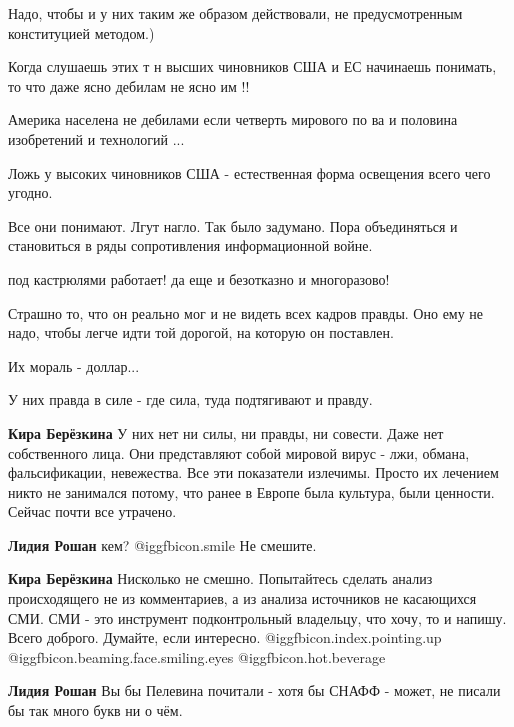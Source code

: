 \begin{itemize}
Надо, чтобы и у них таким же образом действовали, не предусмотренным конституцией методом.)

Когда слушаешь этих т н высших чиновников США и ЕС начинаешь понимать, то что
даже ясно дебилам не ясно им !!

\begin{itemize} %
Америка населена не дебилами если четверть мирового по ва и половина изобретений и технологий ...
\end{itemize} %

Ложь у высоких чиновников США - естественная форма освещения всего чего угодно.


Все они понимают. Лгут нагло. Так было задумано. Пора объединяться и
становиться в ряды сопротивления информационной войне.

под кастрюлями работает! да еще и безотказно и многоразово!


Страшно то, что он реально мог и не видеть всех кадров правды. Оно ему не надо,
чтобы легче идти той дорогой, на которую он поставлен.

Их мораль - доллар...

У них правда в силе - где сила, туда подтягивают и правду.

\begin{itemize} %
\textbf{Кира Берёзкина} У них нет ни силы, ни правды, ни совести. Даже нет собственного лица. Они представляют собой мировой вирус - лжи, обмана, фальсификации, невежества. Все эти показатели излечимы. Просто их лечением никто не занимался потому, что ранее в Европе была культура, были ценности. Сейчас почти все утрачено.

\textbf{Лидия Рошан} кем?  @igg{fbicon.smile}  Не смешите.

\textbf{Кира Берёзкина} Нисколько не смешно. Попытайтесь сделать анализ происходящего не из комментариев, а из анализа источников не касающихся СМИ. СМИ - это инструмент подконтрольный владельцу, что хочу, то и напишу. Всего доброго. Думайте, если интересно.
@igg{fbicon.index.pointing.up}	 
@igg{fbicon.beaming.face.smiling.eyes}  @igg{fbicon.hot.beverage} 

\textbf{Лидия Рошан} Вы бы Пелевина почитали - хотя бы СНАФФ - может, не писали бы так много букв ни о чём.


\end{itemize}
\end{itemize}
